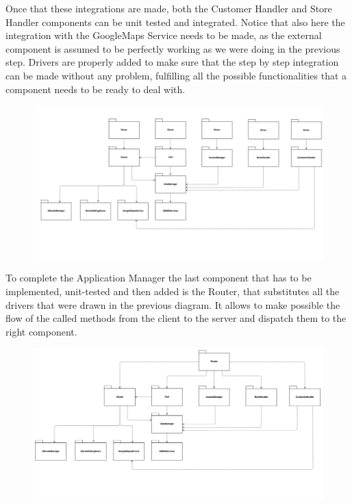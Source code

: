 \documentclass[]{article}
\begin{document}
Once that these integrations are made, both the Customer Handler and Store Handler components can be unit tested and integrated. Notice that also here the integration with the GoogleMaps Service needs to be made, as the external component is assumed to be perfectly working as we were doing in the previous step. Drivers are properly added to make sure that the step by step integration can be made without any problem, fulfilling all the possible functionalities that a component needs to be ready to deal with.
				\begin{figure}[H]
					\centering
					\includegraphics[scale=0.5]{Testing/Testing5.png}
					\caption{}
					\label{fig:Testing}
				\end{figure}

To complete the Application Manager the last component that has to be implemented, unit-tested and then added is the Router, that substitutes all the drivers that were drawn in the previous diagram. It allows to make possible the flow of the called methods from the client to the server and dispatch them to the right component.
				\begin{figure}[H]
					\centering
					\includegraphics[scale=0.5]{Testing/Testing6.png}
					\caption{}
					\label{fig:Testing}
				\end{figure}
\end{document}
